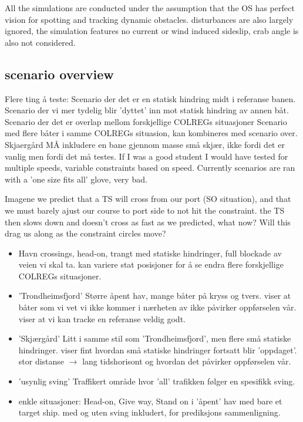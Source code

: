 All the simulations are conducted under the assumption that the \gls{OS} has perfect vision for spotting and tracking dynamic obstacles.
disturbances are also largely ignored, the simulation features no current or wind induced sideslip, crab angle is also not considered.

\subsection{scenario overview}
\iffalse
Flere ting å teste:
Scenario der det er en statisk hindring midt i referanse banen.
Scenario der vi mer tydelig blir 'dyttet' inn mot statisk hindring av annen båt.
Scenario der det er overlap mellom forskjellige COLREGs situasjoner
Scenario med flere båter i samme COLREGs situasion, kan kombineres med scenario over.
Skjaergård MÅ inkludere en bane gjennom masse små skjær, ikke fordi det er vanlig men fordi det må testes.
If I was a good student I would have tested for multiple speeds, variable constraints based on speed.
Currently scenarios are ran with a 'one size fits all' glove, very bad.

Imagene we predict that a TS will cross from our port (SO situation), and that we must barely ajust our course to port side to
not hit the constraint. the TS then slows down and doesn't cross as fast as we predicted, what now? Will this drag us along as the
constraint circles move?

\begin{itemize}
    \item Havn
    \subitem crossings, head-on, trangt med statiske hindringer, full blockade av veien vi skal ta.
    \subitem kan variere stat posisjoner for å se endra flere forskjellige COLREGs situasjoner.
    \item 'Trondheimsfjord'
    \subitem Større åpent hav, mange båter på kryss og tvers.
    \subitem viser at båter som vi vet vi ikke kommer i nærheten av ikke påvirker oppførselen vår.
    \subitem viser at vi kan tracke en referanse veldig godt.
    \item 'Skjærgård'
    \subitem Litt i samme stil som 'Trondheimsfjord', men flere små statiske hindringer.
    \subitem viser fint hvordan små statiske hindringer fortsatt blir 'oppdaget'.
    \subitem stor distanse $\rightarrow$ lang tidshorisont og hvordan det påvirker oppførselen vår.
    \item 'usynlig sving'
    \subitem Traffikert område hvor 'all' trafikken følger en spesifikk sving.
    \item enkle situasjoner:
    \subitem Head-on, Give way, Stand on i 'åpent' hav med bare et target ship.
    \subitem med og uten sving inkludert, for prediksjons sammenligning.
\end{itemize}

